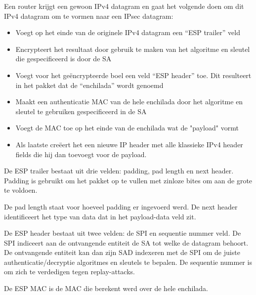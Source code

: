 \noindent Een router krijgt een gewoon IPv4 datagram en gaat het volgende doen om dit IPv4 datagram om te vormen naar een IPsec datagram:
\begin{itemize}
\item Voegt op het einde van de originele IPv4 datagram een “ESP trailer” veld
\item Encrypteert het resultaat door gebruik te maken van het algoritme en sleutel die gespecificeerd is door de SA
\item Voegt voor het geëncrypteerde boel een veld “ESP header” toe. Dit resulteert in het pakket dat de “enchilada” wordt genoemd
\item Maakt een authenticatie MAC van de hele enchilada door het algoritme en sleutel te gebruiken gespecificeerd in de SA
\item Voegt de MAC toe op het einde van de enchilada wat de "payload" vormt
\item Als laatste creëert het een nieuwe IP header met alle klassieke IPv4 header fields die hij dan toevoegt voor de payload.
\end{itemize}

\noindent De ESP trailer bestaat uit drie velden: padding, pad length en next header. Padding is gebruikt om het pakket op te vullen met zinloze bites om aan de grote te voldoen. 

\noindent De pad length staat voor hoeveel padding er ingevoerd werd. De next header identificeert het type van data dat in het payload-data veld zit.

\noindent De ESP header bestaat uit twee velden: de SPI en sequentie nummer veld. De SPI indiceert aan de ontvangende entiteit de SA tot welke de datagram behoort. De ontvangende entiteit kan dan zijn SAD indexeren met de SPI om de juiste authenticatie/decryptie algoritmes en sleutels te bepalen. De sequentie nummer is om zich te verdedigen tegen replay-attacks.



\noindent De ESP MAC is de MAC die berekent werd over de hele enchilada.

